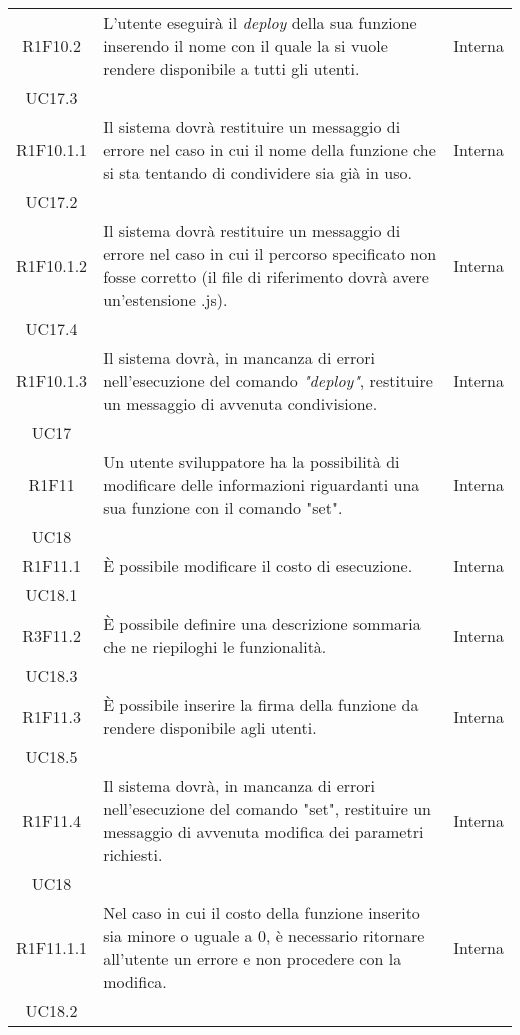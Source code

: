 \begin{longtable}{|c|p{8cm}|C{2cm}|}
	R1F10.2 &  L'utente eseguirà il \textit{deploy\glo} della sua funzione inserendo il nome con il quale la si vuole rendere disponibile a tutti gli utenti. & \centering Interna \\ UC17.3 \tabularnewline
	
	R1F10.1.1 &  Il sistema dovrà restituire un messaggio di errore nel caso in cui il nome della funzione che si sta tentando di condividere sia già in uso. & \centering Interna \\ UC17.2 \tabularnewline
	
	R1F10.1.2 &  Il sistema dovrà restituire un messaggio di errore nel caso in cui il percorso specificato non fosse corretto (il file di riferimento dovrà avere un'estensione .js). & \centering Interna \\ UC17.4 \tabularnewline
	
	R1F10.1.3 &  Il sistema dovrà, in mancanza di errori nell'esecuzione del comando \textit{"deploy\glos"}, restituire un messaggio di avvenuta condivisione. & \centering Interna \\ UC17 \tabularnewline
	
	R1F11 &  Un utente sviluppatore ha la possibilità di modificare delle informazioni riguardanti una sua funzione con il comando "set". & \centering Interna \\ UC18 \tabularnewline
	
	R1F11.1 &  È possibile modificare il costo di esecuzione. & \centering Interna \\ UC18.1 \tabularnewline
	
	R3F11.2 &  È possibile definire una descrizione sommaria che ne riepiloghi le funzionalità. & \centering Interna \\ UC18.3 \tabularnewline
	
	R1F11.3 &  È possibile inserire la firma della funzione da rendere disponibile agli utenti. & \centering Interna \\ UC18.5 \tabularnewline
	
	R1F11.4 &  Il sistema dovrà, in mancanza di errori nell'esecuzione del comando "set", restituire un messaggio di avvenuta modifica dei parametri richiesti. & \centering Interna \\ UC18 \tabularnewline
	
	R1F11.1.1 &  Nel caso in cui il costo della funzione inserito sia minore o uguale a 0, è necessario ritornare all'utente un errore e non procedere con la modifica. & \centering Interna \\ UC18.2 \tabularnewline
	

\end{longtable}
